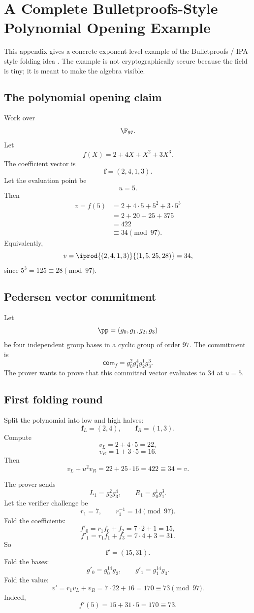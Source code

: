 ﻿\section{A Complete Bulletproofs-Style Polynomial Opening Example}

This appendix gives a concrete exponent-level example of the Bulletproofs / IPA-style folding idea \cite{Bulletproofs2018}. The example is not cryptographically secure because the field is tiny; it is meant to make the algebra visible.

\subsection{The polynomial opening claim}

Work over
\[
    \F_{97}.
\]
Let
\[
    f(X)=2+4X+X^2+3X^3.
\]
The coefficient vector is
\[
    \mathbf f=(2,4,1,3).
\]
Let the evaluation point be
\[
    u=5.
\]
Then
\[
\begin{aligned}
    v=f(5)
    &=2+4\cdot 5+5^2+3\cdot 5^3\\
    &=2+20+25+375\\
    &=422\\
    &\equiv 34\pmod{97}.
\end{aligned}
\]
Equivalently,
\[
    v=\iprod{(2,4,1,3)}{(1,5,25,28)}=34,
\]
since $5^3=125\equiv 28\pmod{97}$.

\subsection{Pedersen vector commitment}

Let
\[
    \pp=(g_0,g_1,g_2,g_3)
\]
be four independent group bases in a cyclic group of order $97$. The commitment is
\[
    \mathsf{com}_f=g_0^2g_1^4g_2^1g_3^3.
\]
The prover wants to prove that this committed vector evaluates to $34$ at $u=5$.

\subsection{First folding round}

Split the polynomial into low and high halves:
\[
    \mathbf f_L=(2,4),
    \qquad
    \mathbf f_R=(1,3).
\]
Compute
\[
    v_L=2+4\cdot 5=22,
\]
\[
    v_R=1+3\cdot 5=16.
\]
Then
\[
    v_L+u^2v_R=22+25\cdot 16=422\equiv 34=v.
\]

The prover sends
\[
    L_1=g_2^2g_3^4,
    \qquad
    R_1=g_0^1g_1^3.
\]
Let the verifier challenge be
\[
    r_1=7,
    \qquad
    r_1^{-1}=14\pmod{97}.
\]
Fold the coefficients:
\[
    f'_0=r_1f_0+f_2=7\cdot 2+1=15,
\]
\[
    f'_1=r_1f_1+f_3=7\cdot 4+3=31.
\]
So
\[
    \mathbf f'=(15,31).
\]
Fold the bases:
\[
    g'_0=g_0^{14}g_2,
    \qquad
    g'_1=g_1^{14}g_3.
\]
Fold the value:
\[
    v'=r_1v_L+v_R=7\cdot22+16=170\equiv 73\pmod{97}.
\]
Indeed,
\[
    f'(5)=15+31\cdot5=170\equiv 73.
\]


